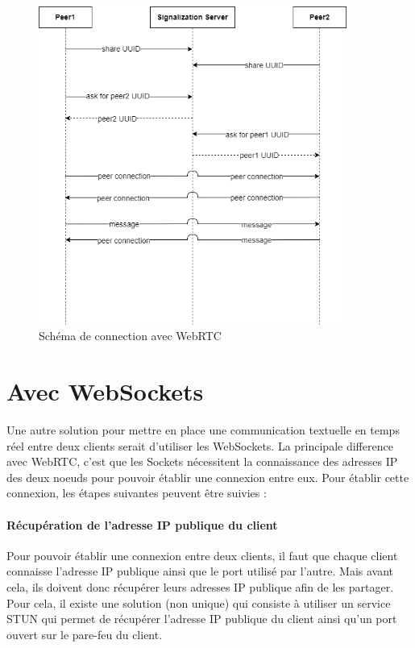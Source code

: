 \begin{figure}[ht]
    \centering
    \includegraphics[width=0.9\textwidth]{assets/webrtc.png}
    \caption{Schéma de connection avec WebRTC}
    \label{fig:webrtc}
\end{figure}

\newpage

\section{Avec WebSockets}

Une autre solution pour mettre en place une communication textuelle en temps réel entre deux clients serait d'utiliser les WebSockets.
La principale difference avec WebRTC, c'est que les Sockets nécessitent la connaissance des adresses IP des deux noeuds pour pouvoir établir une connexion entre eux.
Pour établir cette connexion, les étapes suivantes peuvent être suivies :

\newpage

\paragraph{Récupération de l'adresse IP publique du client}

Pour pouvoir établir une connexion entre deux clients, il faut que chaque client connaisse l'adresse IP publique ainsi que le port utilisé par l'autre. Mais avant cela, ils doivent donc récupérer leurs adresses IP publique afin
de les partager. Pour cela, il existe une solution (non unique) qui consiste à utiliser un service STUN qui permet de récupérer l'adresse IP publique du client ainsi qu'un port ouvert sur le pare-feu du client.

